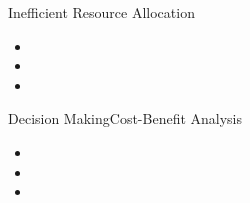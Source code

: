 \documentclass[handout,xcolor=x11names,compress]{beamer}
\renewcommand{\(}{\begin{columns}}
\renewcommand{\)}{\end{columns}}
\newcommand{\<}[1]{\begin{column}{#1}}
\renewcommand{\>}{\end{column}}
\begin{document}
\begin{frame}{Inefficient Resource Allocation}{}
\begin{itemize}[<+->]
 \item 
 \item 
 \item 
\end{itemize}
\end{frame}
\begin{frame}{Decision Making}{Cost-Benefit Analysis}
\begin{itemize}[<+->]
 \item 
 \item 
 \item 
\end{itemize}
\end{frame}
\end{document}
